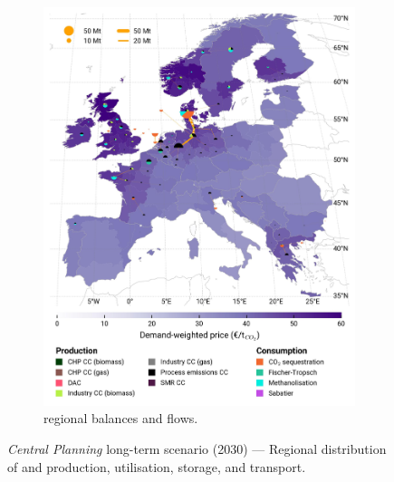 \documentclass[preprint,12pt,sort&compress]{elsarticle}
\begin{document}
\begin{figure}[htbp]
\begin{subfigure}[t]{0.49\textwidth}
      \includegraphics[width=1\textwidth]{maps/greenfield-pipelines/base_s_adm___2030-balance_map_co2_stored} 
      \vspace{-0.7cm}
      \caption{ regional balances and flows.}
      \label{fig:CP_lt_2030_co2}
  \end{subfigure}
  \caption{\textit{Central Planning} long-term scenario (2030) --- Regional distribution of  and  production, utilisation, storage, and transport.}
  \label{fig:CP_lt_2030}
\end{figure}
\end{document}
